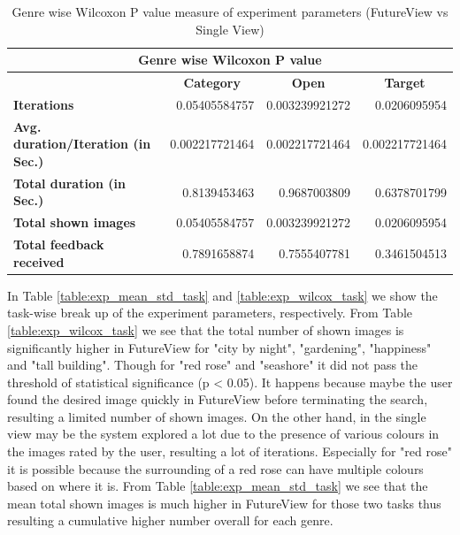 \documentclass[english]{tktltiki}
\begin{document}
\begin{table}
	\small
	\begin{center}
    \begin{tabular}{|l|r|r|r|}
        \hline
        \multicolumn{4}{|c|}{\textbf{Genre wise Wilcoxon P value}} \\
        \hline
        
        \multicolumn{1}{|c|}{} & \multicolumn{1}{|c|}{\textbf{Category}} & \multicolumn{1}{|c|}{\textbf{Open}} & \multicolumn{1}{|c|}{\textbf{Target}} \\
        \hline
        
        
        
        \multicolumn{1}{|l|}{\textbf{Iterations}} & 0.05405584757 & 0.003239921272 & 0.0206095954 \\
        \hline
        
        \multicolumn{1}{|l|}{\textbf{Avg. duration/Iteration (in Sec.)}} & 0.002217721464 & 0.002217721464 & 0.002217721464 \\
        \hline
        
        \multicolumn{1}{|l|}{\textbf{Total duration (in Sec.)}} & 0.8139453463 & 0.9687003809 & 0.6378701799 \\
        \hline
        
        \multicolumn{1}{|l|}{\textbf{Total shown images}} & 0.05405584757 & 0.003239921272 & 0.0206095954 \\
        \hline
        
        \multicolumn{1}{|l|}{\textbf{Total feedback received}} & 0.7891658874 & 0.7555407781 & 0.3461504513 \\
        \hline
        
    \end{tabular}
	\end{center}
	\caption{Genre wise Wilcoxon P value measure of experiment parameters (FutureView vs Single View)}
    \label{table:exp_wilcoxon_genre}
\end{table}

 In Table \ref{table:exp_mean_std_task} and \ref{table:exp_wilcox_task} we show the task-wise break up of the experiment parameters, respectively. From Table \ref{table:exp_wilcox_task} we see that the total number of shown images is significantly higher in FutureView for "city by night", "gardening", "happiness" and "tall building". Though for "red rose" and "seashore" it did not pass the threshold of statistical significance (p < 0.05). It happens because maybe the user found the desired image quickly in FutureView before terminating the search, resulting a limited number of shown images. On the other hand, in the single view may be the system explored a lot due to the presence of various colours in the images rated by the user, resulting a lot of iterations. Especially for "red rose" it is possible because the surrounding of a red rose can have multiple colours based on where it is. From Table \ref{table:exp_mean_std_task} we see that the mean total shown images is much higher in FutureView for those two tasks thus resulting a cumulative higher number overall for each genre.
\end{document}
